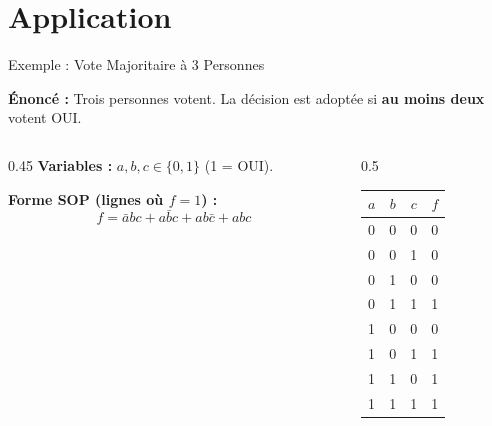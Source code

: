 \section{Application}

\begin{frame}{Exemple : Vote Majoritaire à 3 Personnes}

    \textbf{Énoncé :} Trois personnes votent. La décision est adoptée si \textbf{au moins deux} votent OUI.

    \vspace{0.4cm}

    \begin{columns}[T]
        \begin{column}{0.45\textwidth}
            \textbf{Variables :} \(a, b, c \in \{0,1\}\) (1 = OUI).

            \vspace{0.3cm}
            \textbf{Forme SOP (lignes où \(f=1\)) :}
            \[
                f = \bar{a}bc + a\bar{b}c + ab\bar{c} + abc
            \]
        \end{column}
        \begin{column}{0.5\textwidth}
            \centering
            \begin{tabular}{|c|c|c|c|}
                \hline
                \(a\) & \(b\) & \(c\) & \(f\) \\
                \hline
                0 & 0 & 0 & 0 \\
                0 & 0 & 1 & 0 \\
                0 & 1 & 0 & 0 \\
                0 & 1 & 1 & 1 \\
                1 & 0 & 0 & 0 \\
                1 & 0 & 1 & 1 \\
                1 & 1 & 0 & 1 \\
                1 & 1 & 1 & 1 \\
                \hline
            \end{tabular}
        \end{column}
    \end{columns}

\end{frame}

